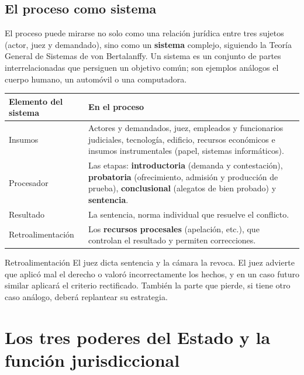 \documentclass[12pt,oneside]{book}
\renewcommand{\arraystretch}{1.15}
\begin{document}
\subsection{El proceso como sistema}

El proceso puede mirarse no solo como una relación jurídica entre tres sujetos (actor, juez y demandado), sino como un \textbf{sistema} complejo, siguiendo la Teoría General de Sistemas de von Bertalanffy. Un sistema es un conjunto de partes interrelacionadas que persiguen un objetivo común; son ejemplos análogos el cuerpo humano, un automóvil o una computadora.

\begin{table}[H]
\centering
\renewcommand{\arraystretch}{1.25}
\begin{tabularx}{\textwidth}{>{\RaggedRight\arraybackslash}p{}>{\RaggedRight\arraybackslash}X}
\toprule
\textbf{Elemento del sistema} & \textbf{En el proceso} \\
\midrule
Insumos & Actores y demandados, juez, empleados y funcionarios judiciales, tecnología, edificio, recursos económicos e insumos instrumentales (papel, sistemas informáticos). \\
\addlinespace
Procesador & Las etapas: \textbf{introductoria} (demanda y contestación), \textbf{probatoria} (ofrecimiento, admisión y producción de prueba), \textbf{conclusional} (alegatos de bien probado) y \textbf{sentencia}. \\
\addlinespace
Resultado & La sentencia, norma individual que resuelve el conflicto. \\
\addlinespace
Retroalimentación & Los \textbf{recursos procesales} (apelación, etc.), que controlan el resultado y permiten correcciones. \\
\bottomrule
\end{tabularx}
\end{table}

\begin{ejemplo}{Retroalimentación}
El juez dicta sentencia y la cámara la revoca. El juez advierte que aplicó mal el derecho o valoró incorrectamente los hechos, y en un caso futuro similar aplicará el criterio rectificado. También la parte que pierde, si tiene otro caso análogo, deberá replantear su estrategia.
\end{ejemplo}

\section{Los tres poderes del Estado y la función jurisdiccional}
\end{document}
